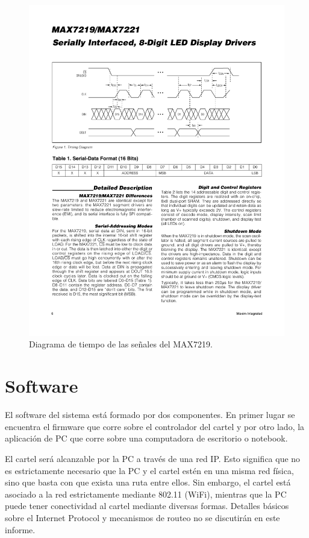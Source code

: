 \begin{figure}[ht!]
	\centering
	\begin{center}
		\includegraphics[width=\textwidth]{imagenes/hw/timingDiagram.pdf}
		\caption{Diagrama de tiempo de las señales del MAX7219.}
		\label{fig:spi-timing-diagram}
	\end{center}
\end{figure}

\pagebreak
\section{Software}\label{sec:sw}
El software del sistema está formado por dos componentes. En primer lugar se encuentra el firmware que corre sobre el controlador del cartel y por otro lado, la aplicación de PC que corre sobre una computadora de escritorio o notebook.

El cartel será alcanzable por la PC a través de una red IP. Esto significa que no es estrictamente necesario que la PC y el cartel estén en una misma red física, sino que basta con que exista una ruta entre ellos. Sin embargo, el cartel está asociado a la red estrictamente mediante 802.11 (WiFi), mientras que la PC puede tener conectividad al cartel mediante diversas formas. Detalles básicos sobre el Internet Protocol y mecanismos de routeo no se discutirán en este informe.

